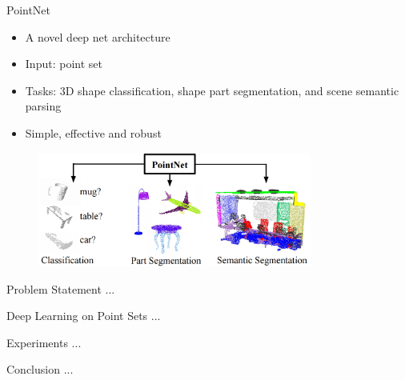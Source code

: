 \documentclass[serif,mathserif]{beamer}
\begin{document}
\begin{frame}{PointNet}
	\begin{itemize}
		\item A novel deep net architecture
		\item Input: point set
		\item Tasks: 3D shape classification, shape part segmentation, and scene semantic parsing 
		\item Simple, effective and robust
	\end{itemize}
	\begin{figure}
		\includegraphics[width=9cm]{image/teaser.png}
	\end{figure}
\end{frame}

\begin{frame}{Problem Statement}
	...
\end{frame}

\begin{frame}{Deep Learning on Point Sets}
	...
\end{frame}

\begin{frame}{Experiments}
	...
\end{frame}

\begin{frame}{Conclusion}
	...
\end{frame}
\end{document}
